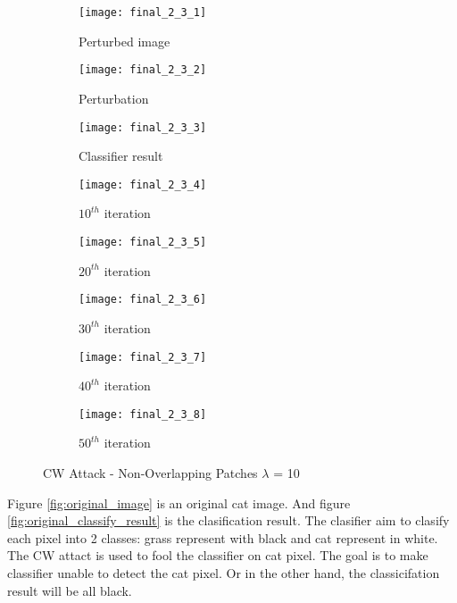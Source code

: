 \documentclass[11pt]{article}
\begin{document}
\begin{figure}[H]
\begin{subfigure}{.22\textwidth}
  \centering
  \texttt{[image: final\_2\_3\_1]}
  \caption{Perturbed image}
  \label{fig:}
\end{subfigure}
\begin{subfigure}{.22\textwidth}
  \centering
  \texttt{[image: final\_2\_3\_2]}
  \caption{Perturbation}
  \label{fig:}
\end{subfigure}
\begin{subfigure}{.22\textwidth}
  \centering
  \texttt{[image: final\_2\_3\_3]}
  \caption{Classifier result}
  \label{fig:}
\end{subfigure}
\begin{subfigure}{.22\textwidth}
  \centering
  \texttt{[image: final\_2\_3\_4]}
  \caption{$10^{th}$ iteration}
  \label{fig:}
\end{subfigure}

\begin{subfigure}{.22\textwidth}
  \centering
  \texttt{[image: final\_2\_3\_5]}
  \caption{$20^{th}$ iteration}
  \label{fig:}
\end{subfigure}
\begin{subfigure}{.22\textwidth}
  \centering
  \texttt{[image: final\_2\_3\_6]}
  \caption{$30^{th}$ iteration}
  \label{fig:}
\end{subfigure}
\begin{subfigure}{.22\textwidth}
  \centering
  \texttt{[image: final\_2\_3\_7]}
  \caption{$40^{th}$ iteration}
  \label{fig:}
\end{subfigure}
\begin{subfigure}{.22\textwidth}
  \centering
  \texttt{[image: final\_2\_3\_8]}
  \caption{$50^{th}$ iteration}
  \label{fig:}
\end{subfigure}

\caption{CW Attack - Non-Overlapping Patches $\lambda$ = 10}
\label{fig:}
\end{figure}

Figure \ref{fig:original_image} is an original cat image. And figure \ref{fig:original_classify_result} is the clasification result.
The clasifier aim to clasify each pixel into 2 classes: grass represent with black and cat represent in white. 
The CW attact is used to fool the classifier on cat pixel. The goal is to make classifier unable to detect the cat pixel. Or in the other hand, the classicifation result will be all black. 
\end{document}
